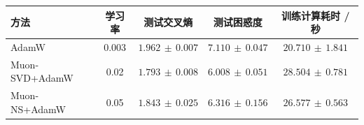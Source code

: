 \begin{tabular}{lcccc}\toprule
方法 & 学习率 & 测试交叉熵 & 测试困惑度 & 训练计算耗时 / 秒 \\ \midrule
AdamW & 0.003 & $1.962\,\pm\,0.007$ & $7.110\,\pm\,0.047$ & $20.710\,\pm\,1.841$ \\
Muon-SVD+AdamW & 0.02 & $1.793\,\pm\,0.008$ & $6.008\,\pm\,0.051$ & $28.504\,\pm\,0.781$ \\
Muon-NS+AdamW & 0.05 & $1.843\,\pm\,0.025$ & $6.316\,\pm\,0.156$ & $26.577\,\pm\,0.563$ \\
\bottomrule\end{tabular}
